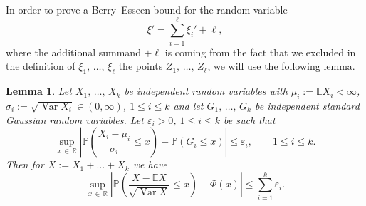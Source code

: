 \documentclass[10pt]{amsart}
\newtheorem{lemm}[theo]{Lemma}\newtheorem{prop}[theo]{Proposition}\newtheorem{coro}[theo]{Corollary}\newtheorem{conj}[theo]{Conjecture}
\theoremstyle{definition}\newtheorem{defi}[theo]{Definition}\newtheorem{rema}[theo]{Remark}\newtheorem{exam}[theo]{Example}\newtheorem{exem}[theo]{Example}\newtheorem{nota}[theo]{Notation}
\newcommand{\var}{\operatorname{Var}}
\newcommand{\bbR}{\mathbb{R}}
\newcommand{\bbE}{\mathbb{E}}
\newcommand{\bbP}{\mathbb{P}}
\begin{document}
In order to prove a Berry--Esseen bound for the random variable
\[
\xi'=\sum_{i=1}^\ell \xi_i'+ \ell,
\]
where the additional summand $+\ell$ is coming from the fact that we excluded in the definition of $\xi_1,\,\ldots,\,\xi_\ell$ the points $Z_1,\,\ldots,\,Z_\ell$, we will use the following lemma.


\begin{lemm}\label{lm:GlueBerryEsseen}
Let $X_1,\,\ldots,\,X_k$ be independent random variables with $\mu_i:=\bbE X_i<\infty$, $\sigma_i:=\sqrt{\var X_i}\in(0,\infty)$, $1\leq i\leq k$ and let $G_1,\,\ldots,\,G_k$ be independent standard Gaussian random variables. Let $\varepsilon_i>0$, $1\leq i\leq k$ be such that
\begin{equation}\label{eq:conditions}
\sup_{x\,\in\,\bbR}\left|\bbP\left(\frac{X_i-\mu_i}{\sigma_i}\leq x\right)-\bbP(G_i\leq x)\right|\leq \varepsilon_i,\qquad 1\leq i\leq k.
\end{equation}
Then for $X:=X_1+\ldots+X_k$ we have
\[
\sup_{x\,\in\,\bbR}\left|\bbP\left(\frac{X-\bbE X}{\sqrt{\var X}}\leq x\right)-\Phi(x)\right|\leq \sum_{i=1}^k\varepsilon_i.
\]
\end{lemm}
\end{document}
